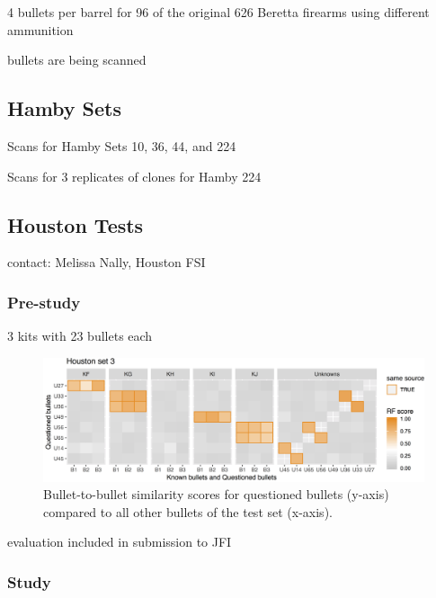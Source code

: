 \documentclass[]{book}
\begin{document}
4 bullets per barrel for 96 of the original 626 Beretta firearms using different ammunition

bullets are being scanned

\hypertarget{hamby-sets}{%
\subsection{Hamby Sets}\label{hamby-sets}}

Scans for Hamby Sets 10, 36, 44, and 224

Scans for 3 replicates of clones for Hamby 224

\hypertarget{houston-tests}{%
\subsection{Houston Tests}\label{houston-tests}}

contact: Melissa Nally, Houston FSI

\hypertarget{pre-study}{%
\subsubsection{Pre-study}\label{pre-study}}

3 kits with 23 bullets each

\begin{figure}

{\centering \includegraphics[width=58.11in]{images/bullets/houston-pre-set3} 

}

\caption{Bullet-to-bullet similarity scores for questioned bullets (y-axis) compared to all other bullets of the test set (x-axis).}\label{fig:unnamed-chunk-8}
\end{figure}

evaluation included in submission to JFI

\hypertarget{study}{%
\subsubsection{Study}\label{study}}
\end{document}
